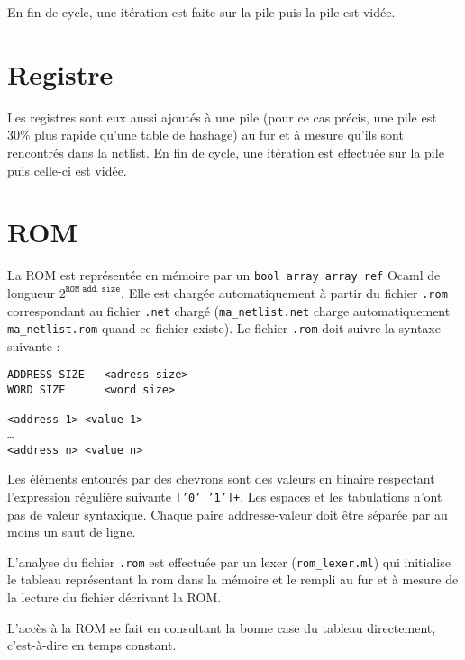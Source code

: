 \documentclass{article}
\newcommand{\code}[1]{\colorbox{JungleGreen}{\texttt{#1}}}
\begin{document}
En fin de cycle, une itération est faite sur la pile puis la pile est vidée.

\section{Registre}
\label{sec:registre}

Les registres sont eux aussi ajoutés à une pile (pour ce cas précis,
une pile est $30\%$ plus rapide qu'une table de hashage) au fur et à
mesure qu'ils sont rencontrés dans la netlist. En fin de cycle, une
itération est effectuée sur la pile puis celle-ci est vidée.

\section{ROM}
\label{sec:rom}

La ROM est représentée en mémoire par un \code{bool array array ref}
Ocaml de longueur $2^\texttt{ROM add. size}$. Elle est
chargée automatiquement à partir du fichier \code{.rom} correspondant
au fichier \code{.net} chargé (\texttt{ma\_netlist.net} charge automatiquement
\texttt{ma\_netlist.rom} quand ce fichier existe). Le fichier
\code{.rom} doit suivre la syntaxe suivante :
\begin{verbatim}
ADDRESS SIZE   <adress size>
WORD SIZE      <word size>

<address 1> <value 1>
…
<address n> <value n>
\end{verbatim}
Les éléments entourés par des chevrons sont des valeurs en
binaire respectant l'expression régulière suivante \code{['0' '1']+}. Les espaces et les tabulations n'ont pas de valeur
syntaxique. Chaque paire addresse-valeur doit être séparée par au
moins un saut de ligne.

L'analyse du fichier \code{.rom} est effectuée par un lexer
(\texttt{rom\_lexer.ml}) qui initialise le tableau représentant la rom
dans la mémoire et le rempli au fur et à mesure de la lecture du
fichier décrivant la ROM.

L'accès à la ROM se fait en consultant la bonne case du tableau
directement, c'est-à-dire en temps constant.
\end{document}
